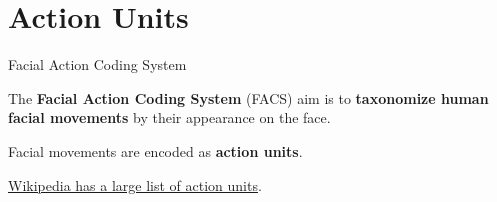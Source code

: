 \documentclass[compress]{beamer}
\begin{document}
\section{Action Units}

\newcommand{\au}[1]{
    \texttt{[image: au/au-0\#1.jpg]}
}


{
\begin{frame}{Facial Action Coding System}

    \begin{center}
         The {\bf Facial Action Coding System} (FACS) aim is to {\bf taxonomize
         human facial movements} by their appearance on the face.

        Facial movements are encoded as {\bf action units}.

    \end{center}

    \href{https://en.wikipedia.org/wiki/Facial_Action_Coding_System}{Wikipedia
    has a large list of action units}.
\end{frame}
}
\end{document}
